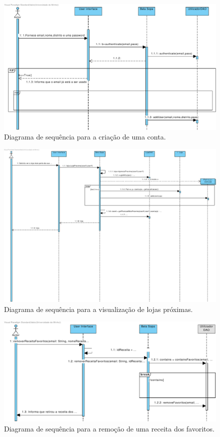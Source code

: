  \begin{figure}[ht]
   \centering
   \includegraphics[width=\textwidth]{figures/10/Registar_Conta.pdf}
   \caption{Diagrama de sequência para a criação de uma conta.}
   \label{fig:negocio:DiagramaSequencia10}
 \end{figure}
 
 \begin{figure}[ht]
   \centering
   \includegraphics[width=\textwidth]{figures/10/Ver_loja_mais_perto.pdf}
   \caption{Diagrama de sequência para a visualização de lojas próximas.}
   \label{fig:negocio:DiagramaSequencia11}
 \end{figure}
 
 \begin{figure}[ht]
   \centering
   \includegraphics[width=\textwidth]{figures/10/Remover_receita_favoritos.pdf}
   \caption{Diagrama de sequência para a remoção de uma receita dos favoritos.}
   \label{fig:negocio:DiagramaSequencia12}
 \end{figure}

